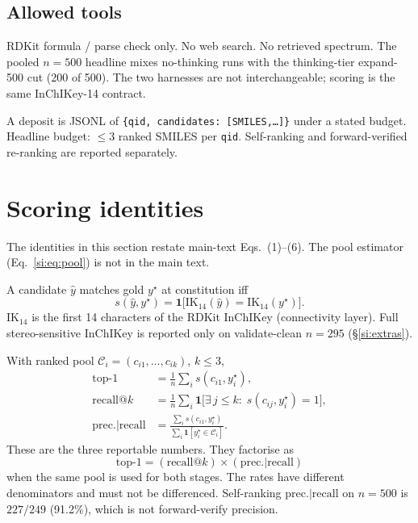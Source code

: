 \documentclass[11pt]{article}
\begin{document}
\subsection{Allowed tools}

RDKit formula / parse check only. No web search. No retrieved spectrum.
The pooled $n{=}500$ headline mixes no-thinking runs with the thinking-tier
expand-500 cut (200 of 500).
The two harnesses are not interchangeable; scoring is the same InChIKey-14 contract.

A deposit is JSONL of \texttt{\{qid, candidates: [SMILES,\ldots]\}} under a
stated budget. Headline budget: $\leq 3$ ranked SMILES per \texttt{qid}.
Self-ranking and forward-verified re-ranking are reported separately.

\section{Scoring identities}
\label{si:eqs}

The identities in this section restate main-text Eqs.~(1)--(6).
The pool estimator (Eq.~\ref{si:eq:pool}) is not in the main text.

A candidate $\hat y$ matches gold $y^\star$ at constitution iff
\begin{equation}
\label{si:eq:ik14}
s(\hat y, y^\star)
=\mathbf{1}\big[\mathrm{IK}_{14}(\hat y)=\mathrm{IK}_{14}(y^\star)\big].
\end{equation}
$\mathrm{IK}_{14}$ is the first 14 characters of the RDKit InChIKey
(connectivity layer). Full stereo-sensitive InChIKey is reported only on
validate-clean $n{=}295$ (\S\ref{si:extras}).

With ranked pool $\mathcal{C}_i=(c_{i1},\ldots,c_{ik})$, $k\leq 3$,
\begin{align}
\label{si:eq:top1}
\mathrm{top\text{-}1}
&=\frac1n\sum_i s(c_{i1}, y_i^\star),\\
\label{si:eq:recall}
\mathrm{recall}@k
&=\frac1n\sum_i \mathbf{1}\big[\exists\,j\leq k:\; s(c_{ij}, y_i^\star)=1\big],\\
\label{si:eq:prec}
\mathrm{prec.}|\mathrm{recall}
&=\frac{\sum_i s(c_{i1}, y_i^\star)}{\sum_i \mathbf{1}[y_i^\star\in\mathcal{C}_i]}.
\end{align}
These are the three reportable numbers. They factorise as
\begin{equation}
\label{si:eq:factor}
\mathrm{top\text{-}1}
=(\mathrm{recall}@k)\times(\mathrm{prec.}|\mathrm{recall})
\end{equation}
when the same pool is used for both stages. The rates have different
denominators and must not be differenced.
Self-ranking $\mathrm{prec.}|\mathrm{recall}$ on $n{=}500$ is $227/249$
(91.2\%), which is not forward-verify precision.
\end{document}
